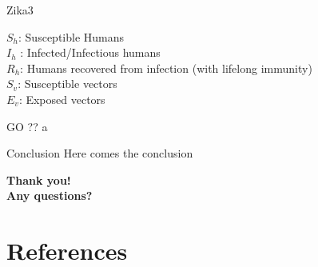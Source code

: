 \documentclass{beamer}\usepackage[]{graphicx}\usepackage[]{color}
\newcommand\unnumbered{\setbeamertemplate{footline}{}}
\begin{document}
\begin{frame}[fragile]{Zika3} %

$S_h$: Susceptible Humans \\
$I_h$ : Infected/Infectious humans \\
$R_h$: Humans recovered from infection (with lifelong immunity) \\
$S_v$: Susceptible vectors \\
$E_v$: Exposed vectors 

\end{frame}

\begin{frame}[fragile]{GO ??}
a
\end{frame}


\begin{frame}[fragile]{Conclusion}
Here comes the conclusion
\end{frame}



\begin{frame}[fragile]{}
\begin{center}
\Huge{\textbf{Thank you!}}\\
\Huge{\textbf{Any questions?}}
\end{center}
\end{frame}

\nocite{polonsky2019}
\nocite{richter2019}

\renewcommand*{\bibfont}{\scriptsize}

\section{References}
{\unnumbered
\begin{frame}[noframenumbering]
  \printbibliography
\end{frame}}
\end{document}
